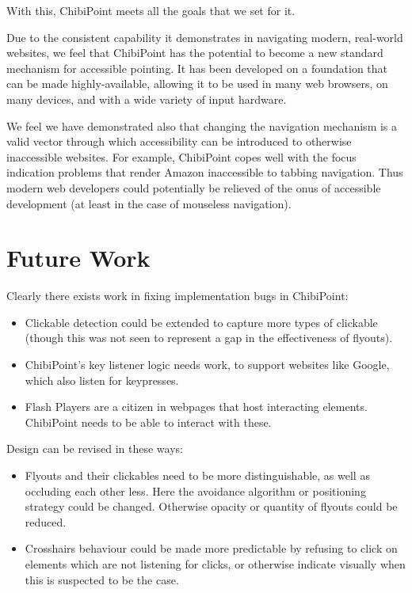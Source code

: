 \documentclass[11pt,openright,a4paper]{report}
\begin{document}
With this, ChibiPoint meets all the goals that we set for it.

Due to the consistent capability it demonstrates in navigating modern, real-world websites, we feel that ChibiPoint has the potential to become a new standard mechanism for accessible pointing. It has been developed on a foundation that can be made highly-available, allowing it to be used in many web browsers, on many devices, and with a wide variety of input hardware.

We feel we have demonstrated also that changing the navigation mechanism is a valid vector through which accessibility can be introduced to otherwise inaccessible websites. For example, ChibiPoint copes well with the focus indication problems that render Amazon inaccessible to tabbing navigation. Thus modern web developers could potentially be relieved of the onus of accessible development (at least in the case of mouseless navigation).

\section{Future Work}
Clearly there exists work in fixing implementation bugs in ChibiPoint:

\begin{itemize}
\item Clickable detection could be extended to capture more types of clickable (though this was not 
seen to represent a gap in the effectiveness of flyouts).
\item ChibiPoint's key listener logic needs work, to support websites like Google, which also listen for keypresses.
\item Flash Players are a citizen in webpages that host interacting elements. ChibiPoint needs to be able to interact with these.
\end{itemize}

Design can be revised in these ways:
\begin{itemize}
\item Flyouts and their clickables need to be more distinguishable, as well as occluding each other less. Here the avoidance algorithm or positioning strategy could be changed. Otherwise opacity or quantity of flyouts could be reduced.
\item Crosshairs behaviour could be made more predictable by refusing to click on elements which are not listening for clicks, or otherwise indicate visually when this is suspected to be the case.
\end{itemize}
\end{document}
